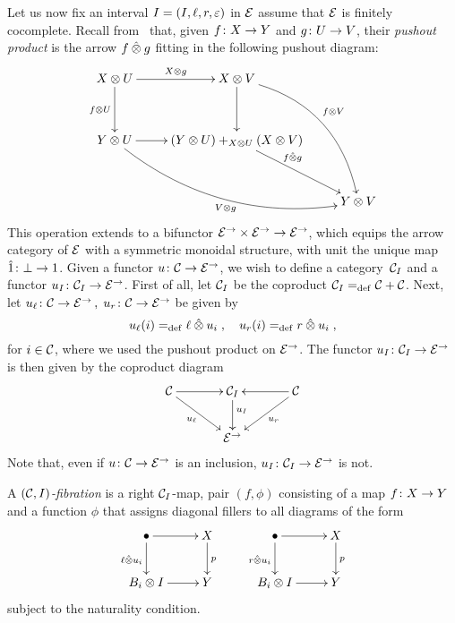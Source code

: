 \documentclass[reqno,10pt,a4paper,oneside]{amsart}
\begin{document}
Let us now fix an interval $\interval = (\interval,  \intervall, \intervalr, \varepsilon)$ in $\catE$ assume that $\catE$ is finitely cocomplete. Recall from~\cite[Section 4]{riehl-verity:reedy} that, given $f \co X \to Y$ and $g \co U \to V$, their \emph{pushout product} is the arrow $f \hatotimes g$ fitting in the following pushout diagram:
\[
\xymatrix@R=1.2cm{
X \otimes U \ar[r]^{X \otimes g}  \ar[d]_{f \otimes U} & X \otimes V \ar@/^2pc/[ddr]^{f \otimes V} \ar[d] & \\ 
Y \otimes U \ar@/_2pc/[drr]_{V \otimes g} \ar[r] & (Y \otimes U) +_{X \otimes U} (X \otimes V) \ar[dr]^-(.35){f \hatotimes g}  & \\ 
 & & Y \otimes V} 
 \]
This operation extends to a bifunctor  $\catE^{\to} \times \catE^{\to} \to \catE^{\to}$, which equips the arrow category of $\catE$ with a symmetric monoidal structure, with unit the unique map $\hatunit \co \initial \to \unit$.
Given a functor $u \co \cal{C} \to \catE^\to$, we wish to define a category~$\cal{C}_\interval$ and a functor $u_\interval \co \cal{C}_\interval \to \catE^\to$. First of all, let $\cal{C}_\interval$ be the coproduct $\cal{C}_\interval  \defeq \cal{C} + \cal{C}$.
 Next, let $u_{\intervall} \co \cal{C} \to \catE^\to \, , \; u_{\intervalr} \co \cal{C} \to \catE^\to$ be given by
 \[
u_{\intervall}(i) \defeq  \intervall \hatotimes u_i \; , \quad
u_{\intervalr}(i) \defeq  \intervalr \hatotimes u_i \; , 
\]
for $i \in \cal{C}$, where we used the pushout product on $\catE^\to$. The functor $u_\interval \co \cal{C}_\interval \to \catE^\to$ is then given by the coproduct diagram
\begin{equation}
\label{equ:u-interval}
\vcenter{\hbox{\xymatrix@C=1.2cm{
\cal{C} \ar[r] \ar[dr]_-{u_\intervall} & \cal{C}_\interval \ar[d]^(.4){u_\interval} & \cal{C} \ar[dl]^-{u_\intervalr} \ar[l] \\ 
 & \catE^\to }}}
\end{equation}
Note that, even if $u \co \cal{C} \to \catE^\to$ is an inclusion, $u_\interval \co \cal{C}_\interval \to \catE^\to$ is not.



\begin{definition} A \emph{$(\cal{C}, \interval)$-fibration} is a right $\cal{C}_\interval$-map, \ie pair $(f, \phi)$ consisting of a map $f \co X \to Y$ and a function $\phi$ that assigns diagonal fillers to all diagrams of the form
\[
\xymatrix{
\bullet \ar[r] \ar[d]_{\intervall \hatotimes u_i} & X \ar[d]^p \\
B_i \otimes \interval \ar[r] & Y} \qquad \xymatrix{
\bullet \ar[r] \ar[d]_{\intervalr \hatotimes u_i} & X \ar[d]^p \\
B_i \otimes \interval \ar[r] & Y}
\]
subject to the naturality condition. 
\end{definition}
\end{document}
